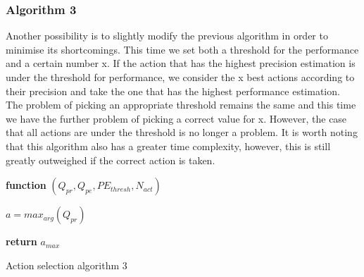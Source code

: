 \subsubsection{Algorithm 3}
Another possibility is to slightly modify the previous algorithm in order to minimise its shortcomings. This time we set both a threshold for the performance and a certain number x. If the action that has the highest precision estimation is under the threshold for performance, we consider the x best actions according to their precision and take the one that has the highest performance estimation.\\
The problem of picking an appropriate threshold remains the same and this time we have the further problem of picking a correct value for x. However, the case that all actions are under the threshold is no longer a problem. It is worth noting that this algorithm also has a greater time complexity, however, this is still greatly outweighed if the correct action is taken.
\begin{center}
	\begin{algorithm}[H]


    \textbf{function}  $(Q_{pr},Q_{pe},PE_{thresh},N_{act})$\;
    
    
    \Indp{}\Indm
    \Indp{} \Indm
    \Indp
   	$a=max_{arg}(Q_{pr})$\\
    
   
  
   \textbf{return} $a_{max}$
   
    
\caption{Action selection algorithm 3}
\end{algorithm}
\end{center}
